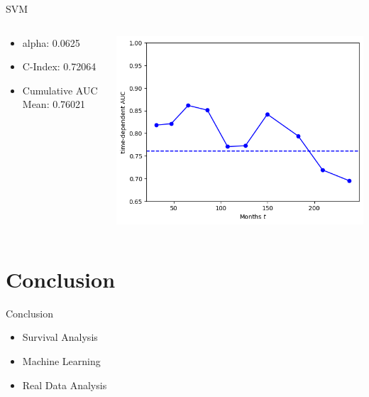 \documentclass{beamer}
\begin{document}
\begin{frame}{SVM}
    \begin{columns}
        \begin{column}{0.49 \textwidth}
            \begin{itemize}
                \item alpha: 0.0625
                \item C-Index: 0.72064
                \item Cumulative AUC Mean: 0.76021
            \end{itemize}
        \end{column}
        \begin{column}{0.49 \textwidth}
            \centering
            \includegraphics[width = \textwidth]{images/svm_r.png}
        \end{column}
    \end{columns}
\end{frame}


\section{Conclusion}
\begin{frame}{Conclusion}
\begin{itemize}
\item Survival Analysis
\item Machine Learning
\item Real Data Analysis
\end{itemize}
\end{frame}
\end{document}
